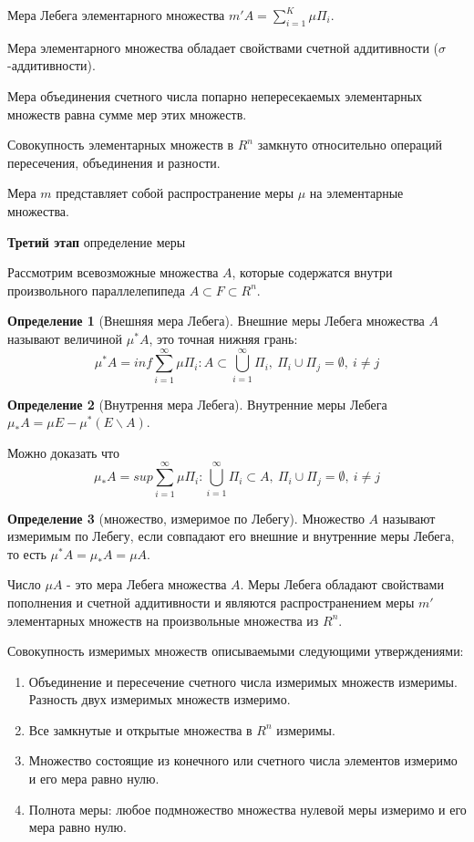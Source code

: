 \documentclass[14pt,a4paper]{extarticle}
\theoremstyle{definition}
\newtheorem{definition}{Определение}[section]
\theoremstyle{remark}
\renewcommand{\[}{\begin{dmath*}[compact]}
\renewcommand{\]}{\end{dmath*}}
\newcommand{\be}{\begin{enumerate}}
\newcommand{\ee}{\end{enumerate}}
\newcommand{\ds}{\displaystyle}
\newcommand{\sep}{ , \ \allowbreak }
\begin{document}
Мера Лебега элементарного множества $\ds m'A=\sum_{i=1}^K\mu\Pi_i$.

Мера элементарного множества обладает свойствами счетной аддитивности
($\sigma$-аддитивности).

Мера объединения счетного числа попарно непересекаемых элементарных множеств
равна сумме мер этих множеств.

Совокупность элементарных множеств в $R^n$ замкнуто относительно операций
пересечения, объединения и разности.

Мера $m$ представляет собой распространение меры $\mu$
на элементарные множества.

\textbf{Третий этап} определение меры

Рассмотрим всевозможные множества $A$, которые содержатся внутри
произвольного параллелепипеда $A\subset F \subset R^n$.

\begin{definition}[Внешняя мера Лебега]
  Внешние меры Лебега множества $A$ называют величиной $\mu^*A$,
  это точная нижняя грань:
  \[\mu^*A=inf\sum_{i=1}^\infty\mu\Pi_i: A\subset\bigcup _{i=1}^\infty\Pi_i\sep
  \Pi_i\cup\Pi_j=\emptyset\sep i\neq j\]
\end{definition}

\begin{definition}[Внутрення мера Лебега]
  Внутренние меры Лебега $\mu_*A=\mu E-\mu^*(E\backslash A)$.
\end{definition}

Можно доказать что
\[\mu_*A=sup\sum_{i=1}^\infty \mu\Pi_i: \bigcup _{i=1}^\infty\Pi_i \subset A
\sep \Pi_i\cup\Pi_j=\emptyset\sep i\neq j\]

\begin{definition}[множество, измеримое по Лебегу]
  Множество $A$ называют измеримым по Лебегу, если совпадают его внешние и
  внутренние меры Лебега, то есть $\mu^*A=\mu_*A=\mu A$.
\end{definition}

Число $\mu A$ - это мера Лебега множества $A$.
Меры Лебега обладают свойствами пополнения и счетной аддитивности и являются
распространением меры $m'$ элементарных множеств на
произвольные множества из $R^n$.

Совокупность измеримых множеств описываемыми следующими утверждениями:
\be
  \item Объединение и пересечение счетного числа измеримых множеств измеримы.
  Разность двух измеримых множеств измеримо.
  \item Все замкнутые и открытые множества в $R^n$ измеримы.
  \item Множество состоящие из конечного или счетного числа элементов
  измеримо и его мера равно нулю.
  \item Полнота меры: любое подмножество множества нулевой меры измеримо
  и его мера равно нулю.
\ee
\end{document}
